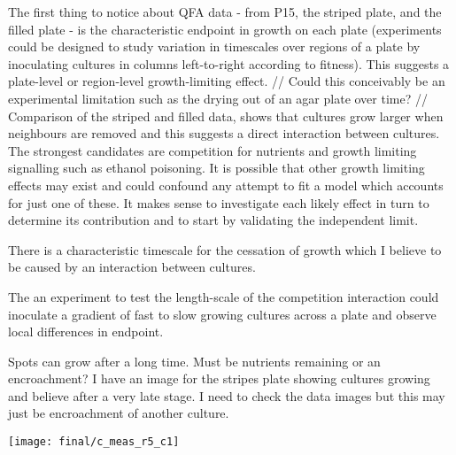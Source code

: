 The first thing to notice about QFA data - from P15, the striped
plate, and the filled plate - is the characteristic endpoint in growth
on each plate (experiments could be designed to study variation in
timescales over regions of a plate by inoculating cultures in columns
left-to-right according to fitness). This suggests a plate-level or
region-level growth-limiting effect.
//
Could this conceivably be an experimental limitation such as the
drying out of an agar plate over time?
//
Comparison of the striped and filled data, shows that cultures grow
larger when neighbours are removed and this suggests a direct
interaction between cultures. The strongest candidates are competition
for nutrients and growth limiting signalling such as ethanol
poisoning. It is possible that other growth limiting effects may exist
and could confound any attempt to fit a model which accounts for just
one of these. It makes sense to investigate each likely effect in turn
to determine its contribution and to start by validating the
independent limit.

There is a characteristic timescale for the cessation of growth which
I believe to be caused by an interaction between cultures.

The an experiment to test the length-scale of the competition interaction
could inoculate a gradient of fast to slow growing cultures across a
plate and observe local differences in endpoint.


Spots can grow after a long time. Must be nutrients remaining or an
encroachment? I have an image for the stripes plate showing cultures
growing and believe after a very late stage. I need to check the data
images but this may just be encroachment of another culture.
\graphicspath{{images/stripes/}}
\begin{Figure}
  \centering
  \texttt{[image: final/c\_meas\_r5\_c1]}
  \label{fig:kn_guessing}
\end{Figure}


